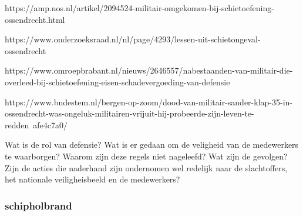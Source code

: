 https://amp.nos.nl/artikel/2094524-militair-omgekomen-bij-schietoefening-ossendrecht.html

https://www.onderzoeksraad.nl/nl/page/4293/lessen-uit-schietongeval-ossendrecht

https://www.omroepbrabant.nl/nieuws/2646557/nabestaanden-van-militair-die-overleed-bij-schietoefening-eisen-schadevergoeding-van-defensie

https://www.bndestem.nl/bergen-op-zoom/dood-van-militair-sander-klap-35-in-ossendrecht-was-ongeluk-militairen-vrijuit-hij-probeerde-zijn-leven-te-redden~afe4c7a0/

Wat is de rol van defensie?
Wat is er gedaan om de veligheid van de medewerkers te waarborgen?
Waarom zijn deze regels niet nageleefd?
Wat zijn de gevolgen?
Zijn de acties die naderhand zijn ondernomen wel redelijk naar de slachtoffers, het nationale veiligheisbeeld en de medewerkers?








\subsubsection{schipholbrand}

